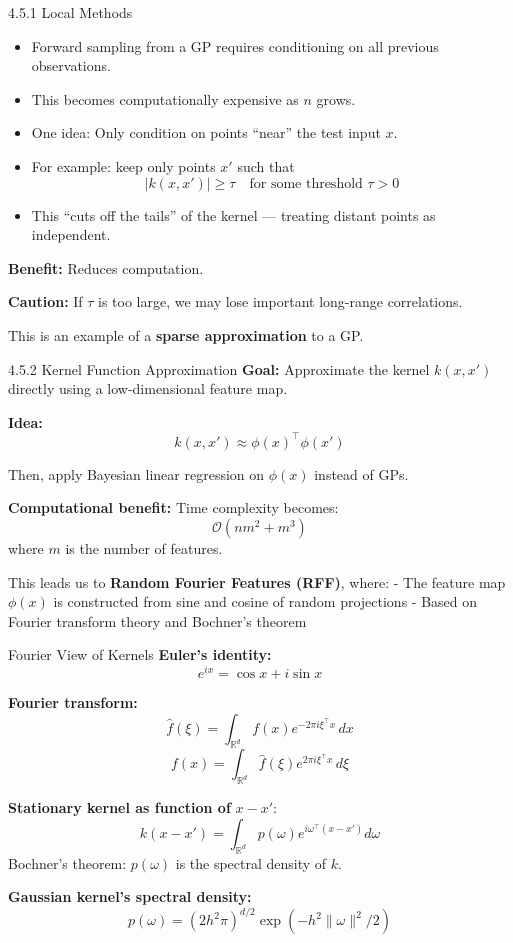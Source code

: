 \documentclass[handout,aspectratio=169]{beamer}
\begin{document}
\begin{frame}{4.5.1 Local Methods}
\begin{itemize}
    \item Forward sampling from a GP requires conditioning on all previous observations.
    \item This becomes computationally expensive as $n$ grows.
    \item One idea: Only condition on points “near” the test input $x$.
    \item For example: keep only points $x'$ such that
    \[
    |k(x, x')| \geq \tau \quad \text{for some threshold } \tau > 0
    \]
    \item This “cuts off the tails” of the kernel — treating distant points as independent.
\end{itemize}

\pause
\vspace{0.2cm}
\textbf{Benefit:} Reduces computation.

\textbf{Caution:} If $\tau$ is too large, we may lose important long-range correlations.

\vspace{0.2cm}
This is an example of a \textbf{sparse approximation} to a GP.
\end{frame}

\begin{frame}{4.5.2 Kernel Function Approximation}
\textbf{Goal:} Approximate the kernel $k(x, x')$ directly using a low-dimensional feature map.

\vspace{0.2cm}
\textbf{Idea:}
\[
k(x, x') \approx \phi(x)^\top \phi(x') \tag{4.34}
\]

Then, apply Bayesian linear regression on $\phi(x)$ instead of GPs.

\vspace{0.3cm}
\textbf{Computational benefit:} Time complexity becomes:
\[
\mathcal{O}(nm^2 + m^3)
\]
where $m$ is the number of features.

\vspace{0.3cm}
\pause
This leads us to \textbf{Random Fourier Features (RFF)}, where:
- The feature map $\phi(x)$ is constructed from sine and cosine of random projections
- Based on Fourier transform theory and Bochner's theorem
\end{frame}

\begin{frame}{Fourier View of Kernels}
\textbf{Euler's identity:}
\[
e^{ix} = \cos x + i \sin x \tag{4.35}
\]

\textbf{Fourier transform:}
\[
\hat{f}(\xi) = \int_{\mathbb{R}^d} f(x) e^{-2\pi i \xi^\top x} \, dx \tag{4.36}
\]
\[
f(x) = \int_{\mathbb{R}^d} \hat{f}(\xi) e^{2\pi i \xi^\top x} \, d\xi \tag{4.37}
\]

\pause
\textbf{Stationary kernel as function of } $x - x'$:
\[
k(x - x') = \int_{\mathbb{R}^d} p(\omega) e^{i \omega^\top (x - x')} d\omega \tag{4.38}
\]
Bochner's theorem: $p(\omega)$ is the spectral density of $k$.

\pause
\textbf{Gaussian kernel’s spectral density:}
\[
p(\omega) = (2h^2 \pi)^{d/2} \exp \left( - h^2 \|\omega\|^2 / 2 \right) \tag{4.39}
\]
\end{frame}
\end{document}
